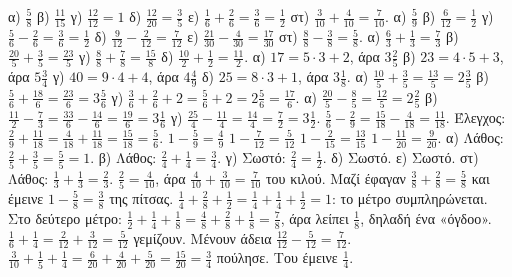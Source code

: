  α) $\frac{5}{8}$ \quad β) $\frac{11}{15}$ \quad γ) $\frac{12}{12}=1$ \quad δ) $\frac{12}{20}=\frac{3}{5}$ \quad ε) $\frac{1}{6}+\frac{2}{6}=\frac{3}{6}=\frac{1}{2}$ \quad στ) $\frac{3}{10}+\frac{4}{10}=\frac{7}{10}$.
 α) $\frac{5}{9}$ \quad β) $\frac{6}{12}=\frac{1}{2}$ \quad γ) $\frac{5}{6}-\frac{2}{6}=\frac{3}{6}=\frac{1}{2}$ \quad δ) $\frac{9}{12}-\frac{2}{12}=\frac{7}{12}$ \quad ε) $\frac{21}{30}-\frac{4}{30}=\frac{17}{30}$ \quad στ) $\frac{8}{8}-\frac{3}{8}=\frac{5}{8}$.
 α) $\frac{6}{3}+\frac{1}{3}=\frac{7}{3}$ \quad β) $\frac{20}{5}+\frac{3}{5}=\frac{23}{5}$ \quad γ) $\frac{8}{8}+\frac{7}{8}=\frac{15}{8}$ \quad δ) $\frac{10}{2}+\frac{1}{2}=\frac{11}{2}$.
 α) $17=5\cdot 3+2$, άρα $3\frac{2}{5}$ \quad β) $23=4\cdot 5+3$, άρα $5\frac{3}{4}$ \quad γ) $40=9\cdot 4+4$, άρα $4\frac{4}{9}$ \quad δ) $25=8\cdot 3+1$, άρα $3\frac{1}{8}$.
 α) $\frac{10}{5}+\frac{3}{5}=\frac{13}{5}=2\frac{3}{5}$ \quad β) $\frac{5}{6}+\frac{18}{6}=\frac{23}{6}=3\frac{5}{6}$ \quad γ) $\frac{3}{6}+\frac{2}{6}+2=\frac{5}{6}+2=2\frac{5}{6}=\frac{17}{6}$.
 α) $\frac{20}{5}-\frac{8}{5}=\frac{12}{5}=2\frac{2}{5}$ \quad β) $\frac{11}{2}-\frac{7}{3}=\frac{33}{6}-\frac{14}{6}=\frac{19}{6}=3\frac{1}{6}$ \quad γ) $\frac{25}{4}-\frac{11}{4}=\frac{14}{4}=\frac{7}{2}=3\frac{1}{2}$.
 $\frac{5}{6}-\frac{2}{9}=\frac{15}{18}-\frac{4}{18}=\frac{11}{18}$. Έλεγχος: $\frac{2}{9}+\frac{11}{18}=\frac{4}{18}+\frac{11}{18}=\frac{15}{18}=\frac{5}{6}$.
 $1-\frac{5}{9}=\frac{4}{9}$ \quad $1-\frac{7}{12}=\frac{5}{12}$ \quad $1-\frac{2}{15}=\frac{13}{15}$ \quad $1-\frac{11}{20}=\frac{9}{20}$.
 α) Λάθος: $\frac{2}{5}+\frac{3}{5}=\frac{5}{5}=1$. β) Λάθος: $\frac{2}{4}+\frac{1}{4}=\frac{3}{4}$. γ) Σωστό: $\frac{2}{4}=\frac{1}{2}$. δ) Σωστό. ε) Σωστό. στ) Λάθος: $\frac{1}{3}+\frac{1}{3}=\frac{2}{3}$.
 $\frac{2}{5}=\frac{4}{10}$, άρα $\frac{4}{10}+\frac{3}{10}=\frac{7}{10}$ του κιλού.
 Μαζί έφαγαν $\frac{3}{8}+\frac{2}{8}=\frac{5}{8}$ και έμεινε $1-\frac{5}{8}=\frac{3}{8}$ της πίτσας.
 $\frac{1}{4}+\frac{2}{8}+\frac{1}{2}=\frac{1}{4}+\frac{1}{4}+\frac{1}{2}=1$: το μέτρο συμπληρώνεται. Στο δεύτερο μέτρο: $\frac{1}{2}+\frac{1}{4}+\frac{1}{8}=\frac{4}{8}+\frac{2}{8}+\frac{1}{8}=\frac{7}{8}$, άρα λείπει $\frac{1}{8}$, δηλαδή ένα «όγδοο».
 $\frac{1}{6}+\frac{1}{4}=\frac{2}{12}+\frac{3}{12}=\frac{5}{12}$ γεμίζουν. Μένουν άδεια $\frac{12}{12}-\frac{5}{12}=\frac{7}{12}$.
 $\frac{3}{10}+\frac{1}{5}+\frac{1}{4}=\frac{6}{20}+\frac{4}{20}+\frac{5}{20}=\frac{15}{20}=\frac{3}{4}$ πούλησε. Του έμεινε $\frac{1}{4}$.
